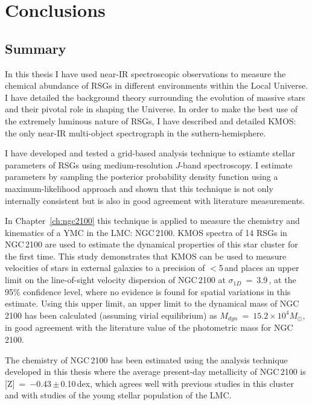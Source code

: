 \chapter{Conclusions}
\label{ch:conclusions}

\section{Summary} %
\label{sec:exec-sum}
In this thesis I have used near-IR spectroscopic observations to measure the chemical abundance of RSGs in different environments within the Local Universe.
I have detailed the background theory surrounding the evolution of massive stars and their pivotal role in shaping the Universe.
In order to make the best use of the extremely luminous nature of RSGs, I have described and detailed KMOS: the only near-IR multi-object spectrograph in the suthern-hemisphere.

I have developed and tested a grid-based analysis technique to estiamte stellar parameters of RSGs using medium-resolution $J$-band spectroscopy.
I estimate parameters by sampling the posterior probability density function using a maximum-likelihood approach and shown that this technique is not only internally consistent but is also in good agreement with literature measurements.

In Chapter~\ref{ch:ngc2100} this technique is applied to measure the chemistry and kinematics of a YMC in the LMC: NGC\,2100.
KMOS spectra of 14 RSGs in NGC\,2100 are used to estimate the dynamical properties of this star cluster for the first time.
This study demonstrates that KMOS can be used to measure velocities of stars in external galaxies to a precision of $<$5\,\kms and places an upper limit on the line-of-sight velocity dispersion of NGC\,2100 at $\sigma_{1D}$~=~3.9\,\kms, at the 95\% confidence level, where no evidence is found for spatial variations in this estimate.
Using this upper limit, an upper limit to the dynamical mass of NGC\,2100 has been calculated (assuming virial equilibrium) as $M_{dyn}$~=~$15.2\times 10^{4}M_{\odot}$, in good agreement with the literature value of the photometric mass for NGC\,2100.

The chemistry of NGC\,2100 has been estimated using the analysis technique developed in this thesis where the average present-day metallicity of NGC\,2100 is [Z]~=~$-$0.43\,$\pm$\,0.10\,dex, which agrees well with previous studies in this cluster and with studies of the young stellar population of the LMC.

